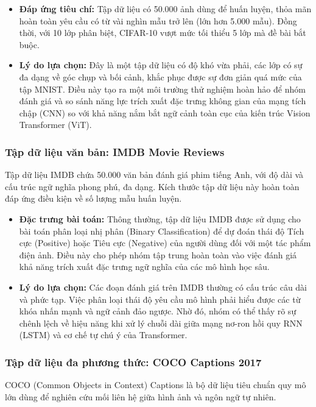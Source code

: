 \documentclass[a4paper]{article}
\theoremstyle{definition}
\begin{document}
\begin{itemize}
	\item \textbf{Đáp ứng tiêu chí:} Tập dữ liệu có 50.000 ảnh dùng để huấn luyện, thỏa mãn hoàn toàn yêu cầu có từ vài nghìn mẫu trở lên (lớn hơn 5.000 mẫu). Đồng thời, với 10 lớp phân biệt, CIFAR-10 vượt mức tối thiểu 5 lớp mà đề bài bắt buộc.

	\item \textbf{Lý do lựa chọn:} Đây là một tập dữ liệu có độ khó vừa phải, các lớp có sự đa dạng về góc chụp và bối cảnh, khắc phục được sự đơn giản quá mức của tập MNIST. Điều này tạo ra một môi trường thử nghiệm hoàn hảo để nhóm đánh giá và so sánh năng lực trích xuất đặc trưng không gian của mạng tích chập (CNN) so với khả năng nắm bắt ngữ cảnh toàn cục của kiến trúc Vision Transformer (ViT).
\end{itemize}

\subsubsection{Tập dữ liệu văn bản: IMDB Movie Reviews}
Tập dữ liệu IMDB chứa 50.000 văn bản đánh giá phim tiếng Anh, với độ dài và cấu trúc ngữ nghĩa phong phú, đa dạng. Kích thước tập dữ liệu này hoàn toàn đáp ứng điều kiện về số lượng mẫu huấn luyện.

\begin{itemize}
	\item \textbf{Đặc trưng bài toán:} Thông thường, tập dữ liệu IMDB được sử dụng cho bài toán phân loại nhị phân (Binary Classification) để dự đoán thái độ Tích cực (Positive) hoặc Tiêu cực (Negative) của người dùng đối với một tác phẩm điện ảnh. Điều này cho phép nhóm tập trung hoàn toàn vào việc đánh giá khả năng trích xuất đặc trưng ngữ nghĩa của các mô hình học sâu.

	\item \textbf{Lý do lựa chọn:} Các đoạn đánh giá trên IMDB thường có cấu trúc câu dài và phức tạp. Việc phân loại thái độ yêu cầu mô hình phải hiểu được các từ khóa nhấn mạnh và ngữ cảnh đảo ngược. Nhờ đó, nhóm có thể thấy rõ sự chênh lệch về hiệu năng khi xử lý chuỗi dài giữa mạng nơ-ron hồi quy RNN (LSTM) và cơ chế tự chú ý của Transformer.
\end{itemize}

\subsubsection{Tập dữ liệu đa phương thức: COCO Captions 2017}
COCO (Common Objects in Context) Captions là bộ dữ liệu tiêu chuẩn quy mô lớn dùng để nghiên cứu mối liên hệ giữa hình ảnh và ngôn ngữ tự nhiên.
\end{document}
